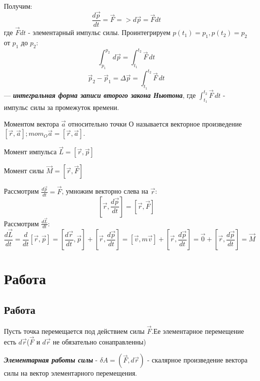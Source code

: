 Получим:
\[ \frac{d\vec p}{dt} = \vec F => d\vec p = \vec F dt\]
где $\vec Fdt$ - элементарный импульс силы. Проинтегрируем $p(t_1) = p_1, p(t_2) = p_2$ от $p_1$ до $p_2$:
\[ \int_{p_1}^{p_2}\,d\vec p  = \int_{t_1}^{t_2} \vec F \,dt \]
\[\vec p_2 - \vec p_1 = \Delta \vec p = \int_{t_1}^{t_2} \vec F \,dt\]
--- \textbf{\textit{интегральная форма записи второго закона Ньютона}}, где $\int_{t_1}^{t_2} \vec F \,dt$ - импульс силы за промежуток времени.

\vspace{5px}

 Моментом вектора $\vec a$ относительно точки О называется векторное произведение $[\vec r, \vec a]; mom_O \vec a = [\vec r, \vec a]$.

\vspace{5px}

 Момент импульса $\vec L = [\vec r, \vec p]$

\vspace{5px}

 Момент силы $\vec M = [\vec r, \vec F]$

\vspace{5px}

Рассмотрим $\frac{d\vec p}{dt} = \vec F$, умножим векторно слева на $\vec r$:
\[ [\vec r, \frac{d \vec p}{dt}] = [\vec r, \vec F]\]
Рассмотрим $\frac{d\vec L}{dt}$:
\[\frac{d\vec L}{dt} = \frac{d}{dt}[\vec r, \vec p] = [\frac{d\vec r}{dt}, \vec p] + [\vec r, \frac{d \vec p}{dt}] = [\vec v, m \vec v] + [\vec r, \frac{d\vec p}{dt}] = \vec 0 + [\vec r, \frac{d\vec p}{dt}] = \vec M\]

\section{Работа}
\subsection{Работа}
Пусть точка перемещается под действием силы $\vec F$.Ее элементарное перемещение есть $d\vec r$($\vec F$ и $d\vec r$ не обязательно сонаправленны)

\vspace{3px}

  \textbf{\textit{Элементарная работы силы}} - $\delta A = (\vec F, d\vec r)$ - скалярное произведение вектора силы на вектор элементарного перемещения.

